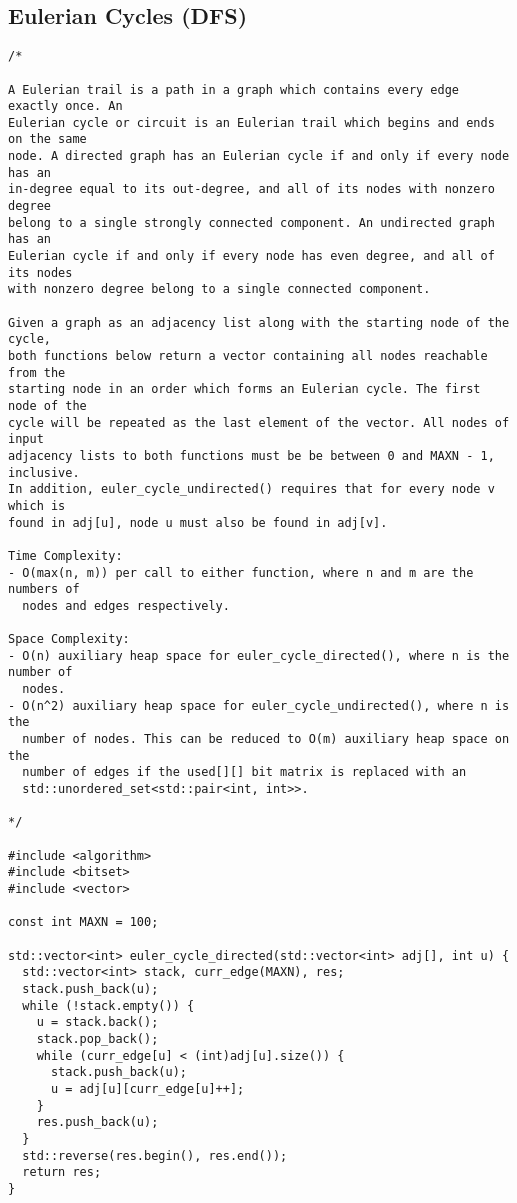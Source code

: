 \subsection{Eulerian Cycles (DFS)}
\begin{lstlisting}
/*

A Eulerian trail is a path in a graph which contains every edge exactly once. An
Eulerian cycle or circuit is an Eulerian trail which begins and ends on the same
node. A directed graph has an Eulerian cycle if and only if every node has an
in-degree equal to its out-degree, and all of its nodes with nonzero degree
belong to a single strongly connected component. An undirected graph has an
Eulerian cycle if and only if every node has even degree, and all of its nodes
with nonzero degree belong to a single connected component.

Given a graph as an adjacency list along with the starting node of the cycle,
both functions below return a vector containing all nodes reachable from the
starting node in an order which forms an Eulerian cycle. The first node of the
cycle will be repeated as the last element of the vector. All nodes of input
adjacency lists to both functions must be be between 0 and MAXN - 1, inclusive.
In addition, euler_cycle_undirected() requires that for every node v which is
found in adj[u], node u must also be found in adj[v].

Time Complexity:
- O(max(n, m)) per call to either function, where n and m are the numbers of
  nodes and edges respectively.

Space Complexity:
- O(n) auxiliary heap space for euler_cycle_directed(), where n is the number of
  nodes.
- O(n^2) auxiliary heap space for euler_cycle_undirected(), where n is the
  number of nodes. This can be reduced to O(m) auxiliary heap space on the
  number of edges if the used[][] bit matrix is replaced with an
  std::unordered_set<std::pair<int, int>>.

*/

#include <algorithm>
#include <bitset>
#include <vector>

const int MAXN = 100;

std::vector<int> euler_cycle_directed(std::vector<int> adj[], int u) {
  std::vector<int> stack, curr_edge(MAXN), res;
  stack.push_back(u);
  while (!stack.empty()) {
    u = stack.back();
    stack.pop_back();
    while (curr_edge[u] < (int)adj[u].size()) {
      stack.push_back(u);
      u = adj[u][curr_edge[u]++];
    }
    res.push_back(u);
  }
  std::reverse(res.begin(), res.end());
  return res;
}


\end{lstlisting}
